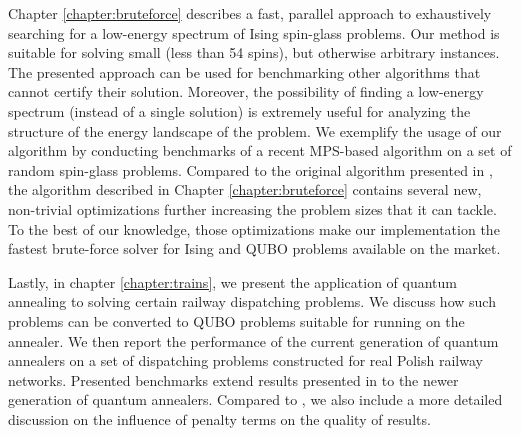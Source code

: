 Chapter \ref{chapter:bruteforce} describes a fast, parallel approach to
exhaustively searching for a low-energy spectrum of Ising spin-glass problems.
Our method is suitable for solving small (less than 54 spins), but otherwise
arbitrary instances. The presented approach can be used for benchmarking other
algorithms that cannot certify their solution. Moreover, the possibility of
finding a low-energy spectrum (instead of a single solution) is extremely
useful for analyzing the structure of the energy landscape of the problem. We
exemplify the usage of our algorithm by conducting benchmarks of a recent
MPS-based algorithm on a set of random spin-glass problems. Compared to the
original algorithm presented in \cite{bruteforce}, the algorithm described in
Chapter \ref{chapter:bruteforce} contains several new, non-trivial
optimizations further increasing the problem sizes that it can tackle. To the
best of our knowledge, those optimizations make our implementation the fastest
brute-force solver for Ising and QUBO problems available on the market.

Lastly, in chapter \ref{chapter:trains}, we present the application of quantum
annealing to solving certain railway dispatching problems. We discuss how such
problems can be converted to QUBO problems suitable for running on the
annealer. We then report the performance of the current generation of quantum
annealers on a set of dispatching problems constructed for real Polish railway
networks. Presented benchmarks extend results presented in
\cite{railwaydispatching} to the newer generation of quantum annealers.
Compared to \cite{railwaydispatching}, we also include a more detailed
discussion on the influence of penalty terms on the quality of results.
